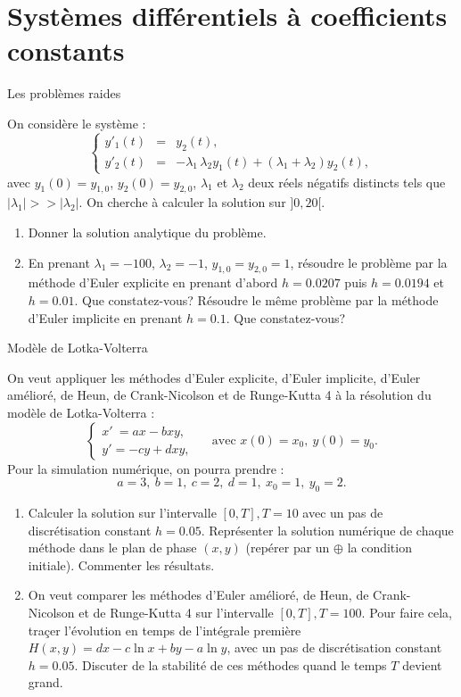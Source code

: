 \documentclass[a4paper,12pt,reqno]{amsart}
\begin{document}
\section{Syst\`emes diff\'erentiels \`a coefficients constants}

\begin{exo} Les probl\`emes raides

On consid\`ere le syst\`eme :
$$
\left\{
\begin{array}{lcl}
y'_1(t)&=&y_2(t),\\
y'_2(t)&=&-\lambda_1 \, \lambda_2 y_1(t)+(\lambda_1+\lambda_2) y_2(t),
\end{array}
\right.
$$
avec $y_1(0)=y_{1,0}$, $y_2(0)=y_{2,0}$, $\lambda_1$ et $\lambda_2$ deux r\'eels n\'egatifs distincts tels que $|\lambda_1| >> |\lambda_2|$. On  cherche \`a calculer la solution sur $]0,20[$.
\begin{enumerate}
\item Donner la solution analytique du probl\`eme.
\item En prenant $\lambda_1=-100$, $\lambda_2=-1$, $y_{1,0}=y_{2,0}=1$, r\'esoudre le probl\`eme par la m\'ethode d'Euler explicite en prenant d'abord $h=0.0207$ puis $h=0.0194$ et $h=0.01$. Que constatez-vous? 
R\'esoudre le m\^eme probl\`eme par la m\'ethode d'Euler implicite en prenant $h=0.1$. Que constatez-vous?
\end{enumerate}
\end{exo}

\begin{exo} Mod\`ele de Lotka-Volterra

On veut appliquer les m\'ethodes d'Euler explicite, d'Euler implicite, d'Euler am\'elior\'e, de Heun, de Crank-Nicolson et de Runge-Kutta 4
\`a la r\'esolution du mod\`ele de Lotka-Volterra :
 $$
 \left\{\begin{aligned}
x' \ =ax-bxy,\\
y'=-cy+dxy,
 \end{aligned}
 \right.
 \quad\mbox{ avec } x(0)=x_0,\ y(0)=y_0.
 $$
 Pour la simulation num\'erique, on pourra prendre :
 $$
 a=3,\ b=1,\ c=2,\ d=1,\ x_0=1,\ y_0=2.
 $$
\begin{enumerate}
\item Calculer la solution sur l'intervalle $[0,T], T=10$ avec un pas de discr\'etisation constant $h= 0.05$.
Repr\'esenter la solution num\'erique de chaque m\'ethode dans le plan de phase $(x,y)$ (rep\'erer par un $\oplus$ la condition initiale).
Commenter les r\'esultats.
\item On veut comparer les m\'ethodes d'Euler am\'elior\'e, de Heun, de Crank-Nicolson et de Runge-Kutta 4 sur l'intervalle $[0,T], T=100$. Pour faire cela, 
tra\c cer l'\'evolution en temps de l'int\'egrale premi\`ere $H(x,y) = dx -c \ln x + by -a \ln y$, avec un pas de discr\'etisation 
constant $h= 0.05$. Discuter de la stabilit\'e de ces m\'ethodes quand le temps $T$ devient grand.
\end{enumerate}
\end{exo}
\end{document}
